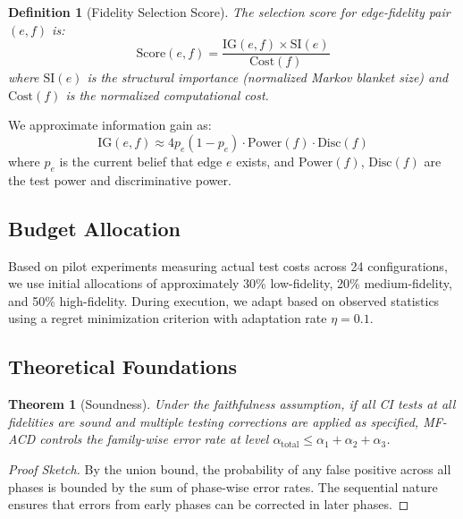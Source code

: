 \documentclass{article}
\newtheorem{theorem}{Theorem}
\newtheorem{definition}{Definition}
\begin{document}
\begin{definition}[Fidelity Selection Score]
The selection score for edge-fidelity pair $(e, f)$ is:
\begin{equation}
\text{Score}(e, f) = \frac{\text{IG}(e, f) \times \text{SI}(e)}{\text{Cost}(f)}
\end{equation}
where $\text{SI}(e)$ is the structural importance (normalized Markov blanket size) and $\text{Cost}(f)$ is the normalized computational cost.
\end{definition}

We approximate information gain as:
\begin{equation}
\text{IG}(e, f) \approx 4 p_e(1-p_e) \cdot \text{Power}(f) \cdot \text{Disc}(f)
\end{equation}
where $p_e$ is the current belief that edge $e$ exists, and $\text{Power}(f)$, $\text{Disc}(f)$ are the test power and discriminative power.

\subsection{Budget Allocation}

Based on pilot experiments measuring actual test costs across 24 configurations, we use initial allocations of approximately 30\% low-fidelity, 20\% medium-fidelity, and 50\% high-fidelity. During execution, we adapt based on observed statistics using a regret minimization criterion with adaptation rate $\eta = 0.1$.

\subsection{Theoretical Foundations}

\begin{theorem}[Soundness]
Under the faithfulness assumption, if all CI tests at all fidelities are sound and multiple testing corrections are applied as specified, MF-ACD controls the family-wise error rate at level $\alpha_{\text{total}} \leq \alpha_1 + \alpha_2 + \alpha_3$.
\end{theorem}

\begin{proof}[Proof Sketch]
By the union bound, the probability of any false positive across all phases is bounded by the sum of phase-wise error rates. The sequential nature ensures that errors from early phases can be corrected in later phases.
\end{proof}
\end{document}
